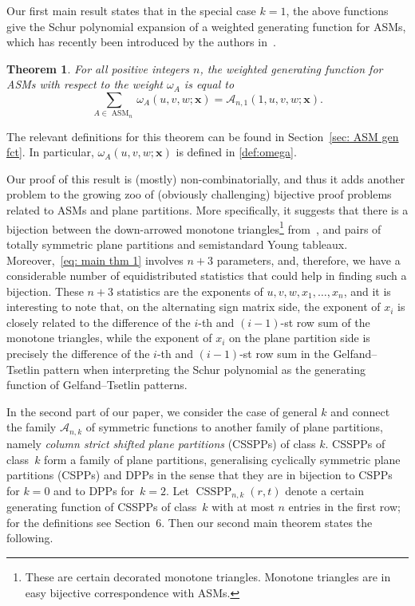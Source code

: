 \documentclass[11pt]{article}
\newtheorem{thm}[theo]{Theorem}
\theoremstyle{definition}
\numberwithin{equation}{section}
\newcommand{\x}{\mathbf{x}}
\newcommand{\A}{\mathcal{A}}
\DeclareMathOperator{\ASM}{ASM}
\DeclareMathOperator{\CSSPP}{CSSPP}
\newcounter{x}
\newcounter{y}
\newcounter{z}
\newcounter{help}
\begin{document}
Our first main result states that in the special case $k=1$, the above functions give the Schur polynomial expansion of a weighted generating function for ASMs, which has recently been introduced by the authors in~\cite{FischerSchreierAigner23}.

\begin{thm}
\label{thm: main thm 1}
For all positive integers $n$, the weighted generating function for ASMs with respect to the weight $\omega_A$ is equal to
\begin{equation}
\label{eq: main thm 1}
\sum_{A \in \ASM_n} \omega_A(u,v,w;\x) = \A_{n,1}(1, u,v,w;\x).
\end{equation}
\end{thm}
The relevant definitions for this theorem can be found in Section~\ref{sec: ASM gen fct}. In particular, $\omega_A(u,v,w;\x)$ is defined in 
\eqref{def:omega}.

Our proof of this result is (mostly) non-combinatorially, and thus it adds another problem to the growing zoo of (obviously challenging) bijective proof problems related to ASMs and plane partitions. More specifically, it suggests that there is a bijection between the down-arrowed monotone triangles\footnote{These are certain decorated monotone triangles. Monotone triangles are in easy bijective correspondence with ASMs.} from~\cite{FischerSchreierAigner23}, and pairs of totally symmetric plane partitions and semistandard Young tableaux. Moreover,~\eqref{eq: main thm 1} involves $n+3$ parameters, and, therefore, we have a considerable number of equidistributed statistics that could help in finding such a bijection. These $n+3$ statistics are the exponents of $u,v,w,x_1,\ldots,x_n$, and
it is interesting to note that, on the alternating sign matrix side, 
the exponent of $x_i$ is closely related to the difference of the $i$-th and $(i-1)$-st row sum of the monotone triangles, while the exponent of $x_i$ on the plane partition side is precisely the  difference of the $i$-th and $(i-1)$-st row sum in the Gelfand--Tsetlin pattern when interpreting the Schur polynomial as the generating function of Gelfand--Tsetlin patterns.

In the second part of our paper, we consider the case of general $k$ and connect the family $\A_{n,k}$ of symmetric functions to another family of plane partitions, namely \emph{column strict shifted plane partitions} (CSSPPs) of class $k$. CSSPPs of class~$k$ form a family of plane partitions, generalising cyclically symmetric plane partitions (CSPPs) and DPPs in the sense that they are in bijection to CSPPs for $k=0$ and to DPPs for~$k=2$. 
Let $\CSSPP_{n,k}(r,t)$ denote a certain generating function of CSSPPs of class~$k$ with at most $n$ entries in the first row; for the definitions see Section~6. Then our second main theorem states the following.
\end{document}
